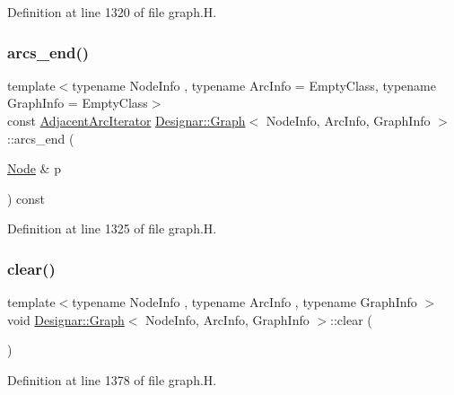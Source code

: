 Definition at line 1320 of file graph.\+H.

\mbox{\label{class_designar_1_1_graph_a305a413007d60401317366c92245bfa4}} 
\subsubsection{\texorpdfstring{arcs\+\_\+end()}{arcs\_end()}\hspace{0.1cm}{\footnotesize\ttfamily [4/4]}}
{\footnotesize\ttfamily template$<$typename Node\+Info , typename Arc\+Info  = Empty\+Class, typename Graph\+Info  = Empty\+Class$>$ \\
const \hyperlink{class_designar_1_1_graph_1_1_adjacent_arc_iterator}{Adjacent\+Arc\+Iterator} \hyperlink{class_designar_1_1_graph}{Designar\+::\+Graph}$<$ Node\+Info, Arc\+Info, Graph\+Info $>$\+::arcs\+\_\+end (\begin{DoxyParamCaption}\item[{\hyperlink{class_designar_1_1_graph_a5dfc7dba9d092ac489c72e40390c37d0}{Node} \&}]{p }\end{DoxyParamCaption}) const\hspace{0.3cm}{\ttfamily [inline]}}



Definition at line 1325 of file graph.\+H.

\mbox{\label{class_designar_1_1_graph_acfebca533d00dae0c40b0dd88f64296c}} 
\subsubsection{\texorpdfstring{clear()}{clear()}}
{\footnotesize\ttfamily template$<$typename Node\+Info , typename Arc\+Info , typename Graph\+Info $>$ \\
void \hyperlink{class_designar_1_1_graph}{Designar\+::\+Graph}$<$ Node\+Info, Arc\+Info, Graph\+Info $>$\+::clear (\begin{DoxyParamCaption}{ }\end{DoxyParamCaption})}



Definition at line 1378 of file graph.\+H.

